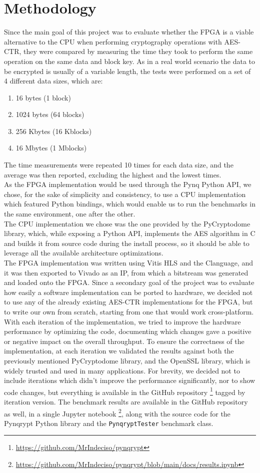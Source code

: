 \documentclass[12pt,oneside,a4paper]{article}
\def\CC{{C\nolinebreak[4]\hspace{-.05em}\raisebox{.4ex}{\tiny\bf ++}}}
\begin{document}
\section{Methodology} \label{sec:methodology}
Since the main goal of this project was to evaluate whether the FPGA is a viable alternative to the CPU when performing cryptography operations with AES-CTR, they were compared by measuring the time they took to perform the same operation on the same data and block key.
As in a real world scenario the data to be encrypted is usually of a variable length, the tests were performed on a set of 4 different data sizes, which are:
\begin{enumerate}
	\item 16 bytes (1 block)
	\item 1024 bytes (64 blocks)
	\item 256 Kbytes (16 Kblocks)
	\item 16 Mbytes (1 Mblocks)
\end{enumerate}
The time measurements were repeated 10 times for each data size, and the average was then reported, excluding the highest and the lowest times.
\\As the FPGA implementation would be used through the Pynq Python API, we chose, for the sake of simplicity and consistency, to use a CPU implementation which featured Python bindings, which would enable us to run the benchmarks in the same environment, one after the other.
\\The CPU implementation we chose was the one provided by the PyCryptodome library, which, while exposing a Python API, implements the AES algorithm in C and builds it from source code during the install process, so it should be able to leverage all the available architecture optimizations.
\\The FPGA implementation was written using Vitis HLS and the \CC language, and it was then exported to Vivado as an IP, from which a bitstream was generated and loaded onto the FPGA.
Since a secondary goal of the project was to evaluate how easily a software implementation can be ported to hardware, we decided not to use any of the already existing AES-CTR implementations for the FPGA, but to write our own from scratch, starting from one that would work cross-platform.
With each iteration of the implementation, we tried to improve the hardware performance by optimizing the code, documenting which changes gave a positive or negative impact on the overall throughput.
To ensure the correctness of the implementation, at each iteration we validated the results against both the previously mentioned PyCryptodome library, and the OpenSSL library, which is widely trusted and used in many applications.
For brevity, we decided not to include iterations which didn't improve the performance significantly, nor to show code changes, but everything is available in the GitHub repository \footnote{\url{https://github.com/MrIndeciso/pynqrypt}} tagged by iteration version.
The benchmark results are available in the GitHub repository as well, in a single Jupyter notebook \footnote{\url{https://github.com/MrIndeciso/pynqrypt/blob/main/docs/results.ipynb}}, along with the source code for the Pynqrypt Python library and the \texttt{PynqryptTester} benchmark class.
\end{document}
